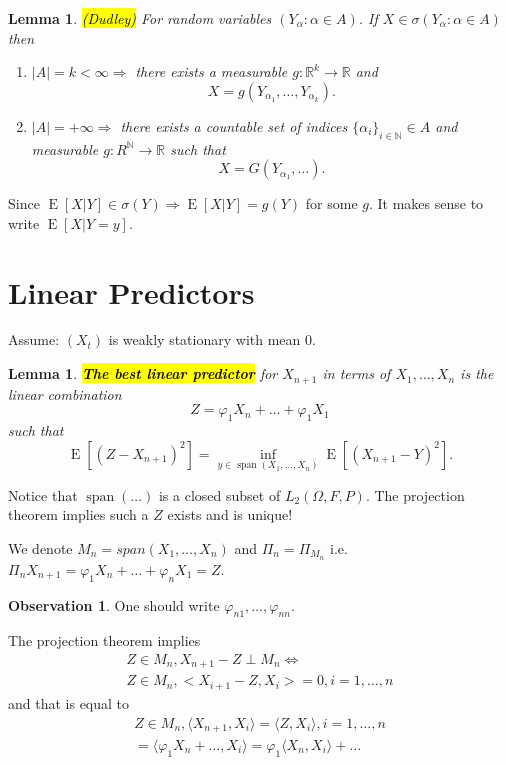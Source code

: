 \documentclass[12pt,a4paper, notitlepage]{book}
\newcommand{\hlc}[2][yellow]{ {\sethlcolor{#1} \hl{#2}} }
\newcommand{\hlcr}[1]{\hlc[lightred]{#1}}
\theoremstyle{definition} %
\newtheorem*{observation}{Observation}
\theoremstyle{plain} %
\newtheorem{definition}{Lemma}[chapter]
\newtheorem{lemma}{Lemma}[chapter]
\newcommand{\R}{\mathbb R}
\newcommand{\N}{\mathbb N}
\DeclareMathOperator{\E}{E}
\DeclareMathOperator{\Span}{span}
\newcommand{\New}[1]{ {\bf \hlcr{#1} } }
\newcommand{\Important}[1]{ {\it \hlc{#1} } }
\begin{document}
\begin{lemma} \Important{(Dudley)}
For random variables $(Y_\alpha: \alpha \in A)$. If $X \in \sigma(Y_\alpha: \alpha \in A)$ then
\begin{enumerate}
\item $|A| = k < \infty \Rightarrow$ there exists a measurable $g: \R^k \rightarrow \R$ and 
\[X = g(Y_{\alpha_1}, \dots, Y_{\alpha_k}) . \]
\item $|A| = +\infty \Rightarrow$ there exists a countable set of indices $\{\alpha_i\}_{i \in \N} \in A$ and measurable
$g: R^\N \rightarrow \R$ such that 
\[ X = G(Y_{\alpha_1}, \dots) . \]
\end{enumerate}
\end{lemma}

Since $\E[X|Y] \in \sigma(Y) \Rightarrow \E[X|Y] = g(Y)$ for some $g$. It makes sense to write $\E[X | Y = y]$. 

\section{Linear Predictors}

Assume: $(X_t)$ is weakly stationary with mean $0$. 

\begin{definition}
\New{ The best  linear predictor} for $X_{n+1}$ in terms of $X_1, \dots, X_n$ is the linear combination 
\[ Z = \varphi_1 X_n + \dots + \varphi_1 X_1 \]
such that 
\[ \E\left[ (Z - X_{n+1})^2\right] = \inf_{y \in 
\Span(X_1, \dots, X_n)} \E\left[(X_{n+1} -Y)^2 \right]  . \]
\end{definition}

Notice that $ \Span(\dots)$ is a closed subset of $L_2(\Omega, F, P)$. The projection theorem implies such a $Z$ exists and is unique! 

We denote $M_n = span(X_1, \dots, X_n)$ and $\Pi_n = \Pi_{M_n}$ i.e. $\Pi_nX_{n+1} = \varphi_1 X_n + \dots + \varphi_n X_1 = Z$. 

\begin{observation}
One should write $\varphi_{n 1}, \dots, \varphi_{n n}$.
\end{observation}

The projection theorem implies 
\begin{align*} Z \in M_n, X_{n+1} - Z \perp M_n \iff \\
 Z \in M_n, <X_{i+1} - Z, X_i> = 0, i = 1, \dots, n \end{align*}
 and that is equal to
\begin{align*}
Z \in M_n, \langle X_{n+1}, X_i \rangle = \langle Z, X_i \rangle,  i = 1, \dots, n \\
 = \langle \varphi_1 X_n+ \dots, X_i \rangle = \varphi_1 \langle X_n, X_i \rangle + \dots 
\end{align*}
\end{document}
